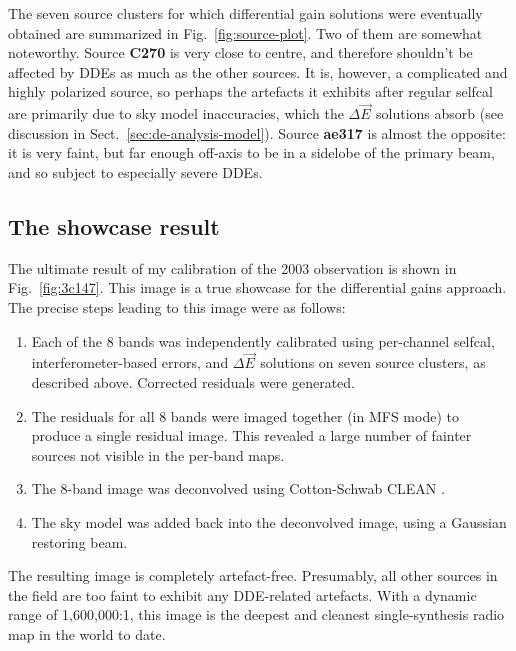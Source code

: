 \documentclass{aa}
\newcommand{\jones}[2]{\vec {#1}_{#2}}
\begin{document}
The seven source clusters for which differential gain solutions were eventually obtained are summarized in Fig.~\ref{fig:source-plot}. Two of them are somewhat noteworthy. Source {\bf C270} is very close to centre, and therefore shouldn't be affected by DDEs as much as the other sources. It is, however, a complicated and highly polarized source, so perhaps the artefacts it exhibits after regular selfcal are primarily due to sky model inaccuracies, which the $\Delta\jones{E}{}$ solutions absorb (see discussion in Sect.~\ref{sec:de-analysis-model}). Source {\bf ae317} is almost the opposite: it is very faint, but far enough off-axis to be in a sidelobe of the primary beam, and so subject to especially severe DDEs.

\subsection{The showcase result} 

The ultimate result of my calibration of the 2003 observation is shown in Fig.~\ref{fig:3c147}. This image is a true showcase for the differential gains approach. The precise steps leading to this image were as follows:

\begin{enumerate}

\item Each of the 8 bands was independently calibrated using per-channel selfcal, interferometer-based errors, and $\Delta\jones{E}{}$ solutions on seven source clusters, as described above. Corrected residuals were generated.

\item The residuals for all 8 bands were imaged together (in MFS mode) to produce a single residual image. This revealed a large number of fainter sources not visible in the per-band maps.

\item The 8-band image was deconvolved using Cotton-Schwab CLEAN \citep{Schwab:csclean}.

\item The sky model was added back into the deconvolved image, using a Gaussian restoring beam.

\end{enumerate}

The resulting image is completely artefact-free. Presumably, all other sources in the field are too faint to exhibit any DDE-related artefacts. With a dynamic range of 1,600,000:1, this image is the deepest and cleanest single-synthesis radio map in the world to date. 
\end{document}
